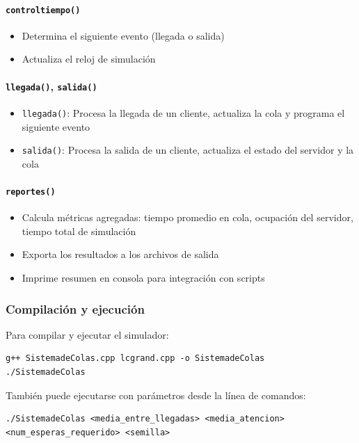 \documentclass{article}
\begin{document}
\paragraph{\texttt{controltiempo()}}
\begin{itemize}
    \item Determina el siguiente evento (llegada o salida)
    \item Actualiza el reloj de simulación
\end{itemize}

\paragraph{\texttt{llegada()}, \texttt{salida()}}
\begin{itemize}
    \item \texttt{llegada()}: Procesa la llegada de un cliente, actualiza la cola y programa el siguiente evento
    \item \texttt{salida()}: Procesa la salida de un cliente, actualiza el estado del servidor y la cola
\end{itemize}

\paragraph{\texttt{reportes()}}
\begin{itemize}
    \item Calcula métricas agregadas: tiempo promedio en cola, ocupación del servidor, tiempo total de simulación
    \item Exporta los resultados a los archivos de salida
    \item Imprime resumen en consola para integración con scripts
\end{itemize}

\subsubsection{Compilación y ejecución}

Para compilar y ejecutar el simulador:

\begin{verbatim}
g++ SistemadeColas.cpp lcgrand.cpp -o SistemadeColas
./SistemadeColas
\end{verbatim}

También puede ejecutarse con parámetros desde la línea de comandos:

\begin{verbatim}
./SistemadeColas <media_entre_llegadas> <media_atencion> <num_esperas_requerido> <semilla>
\end{verbatim}
\end{document}
